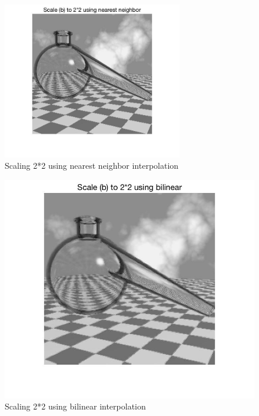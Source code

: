 \documentclass[11pt,oneside]{book}
\begin{document}
\begin{figure}[!htb]
   \centering  
   \includegraphics[width=0.7\textwidth]{images/6/scale_nn.jpg}
   \caption{Scaling 2*2 using nearest neighbor interpolation}
\end{figure}
\begin{figure}[!htb]
   \centering  
   \includegraphics[width=1\textwidth]{images/6/scale_b.jpg}
   \caption{Scaling 2*2 using bilinear interpolation}
\end{figure}

\newpage
\end{document}
